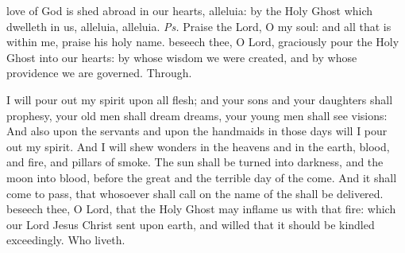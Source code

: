 \clearpage
{}

\introit
{} love of God is shed abroad in our hearts, alleluia: by the Holy Ghost which dwelleth in us, alleluia, alleluia. \textit{Ps.} Praise the Lord, O my soul: and all that is within me, praise his holy name.
\collect
{} beseech thee, O Lord, graciously pour the Holy Ghost into our hearts: by whose wisdom we were created, and by whose providence we are governed. Through.

 I will pour out my spirit upon all flesh; and your sons and your daughters shall prophesy, your old men shall dream dreams, your young men shall see visions: And also upon the servants and upon the handmaids in those days will I pour out my spirit. And I will shew wonders in the heavens and in the earth, blood, and fire, and pillars of smoke. The sun shall be turned into darkness, and the moon into blood, before the great and the terrible day of the  come. And it shall come to pass, that whosoever shall call on the name of the  shall be delivered.
\collect
{} beseech thee, O Lord, that the Holy Ghost may inflame us with that fire: which our Lord Jesus Christ sent upon earth, and willed that it should be kindled exceedingly. Who liveth.

